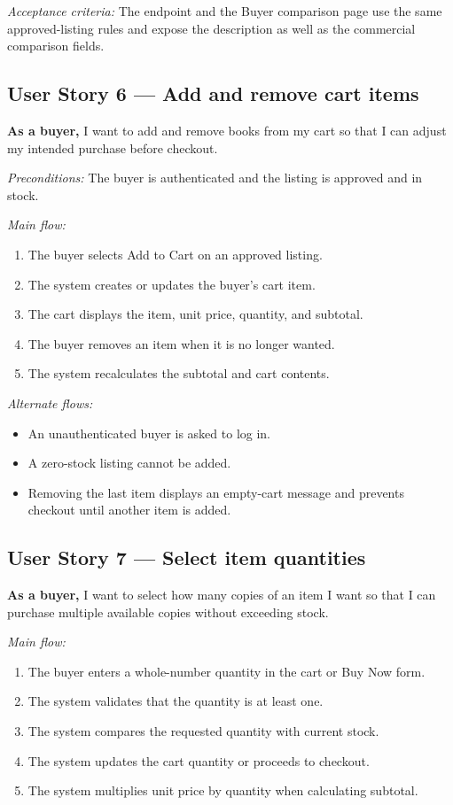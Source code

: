 \documentclass[11pt]{scrreprt}
\newcommand{\code}[1]{\texttt{\detokenize{#1}}}
\begin{document}
\textit{Acceptance criteria:} The endpoint
\code{GET /api/listings/compare?ids=<ids>} and the Buyer comparison page use
the same approved-listing rules and expose the description as well as the
commercial comparison fields.

\subsection{User Story 6 --- Add and remove cart items}
\textbf{As a buyer,} I want to add and remove books from my cart so that I can
adjust my intended purchase before checkout.

\textit{Preconditions:} The buyer is authenticated and the listing is approved
and in stock.

\textit{Main flow:}
\begin{enumerate}
\item The buyer selects Add to Cart on an approved listing.
\item The system creates or updates the buyer's cart item.
\item The cart displays the item, unit price, quantity, and subtotal.
\item The buyer removes an item when it is no longer wanted.
\item The system recalculates the subtotal and cart contents.
\end{enumerate}

\textit{Alternate flows:}
\begin{itemize}
\item An unauthenticated buyer is asked to log in.
\item A zero-stock listing cannot be added.
\item Removing the last item displays an empty-cart message and prevents
checkout until another item is added.
\end{itemize}

\subsection{User Story 7 --- Select item quantities}
\textbf{As a buyer,} I want to select how many copies of an item I want so
that I can purchase multiple available copies without exceeding stock.

\textit{Main flow:}
\begin{enumerate}
\item The buyer enters a whole-number quantity in the cart or Buy Now form.
\item The system validates that the quantity is at least one.
\item The system compares the requested quantity with current stock.
\item The system updates the cart quantity or proceeds to checkout.
\item The system multiplies unit price by quantity when calculating subtotal.
\end{enumerate}
\end{document}
